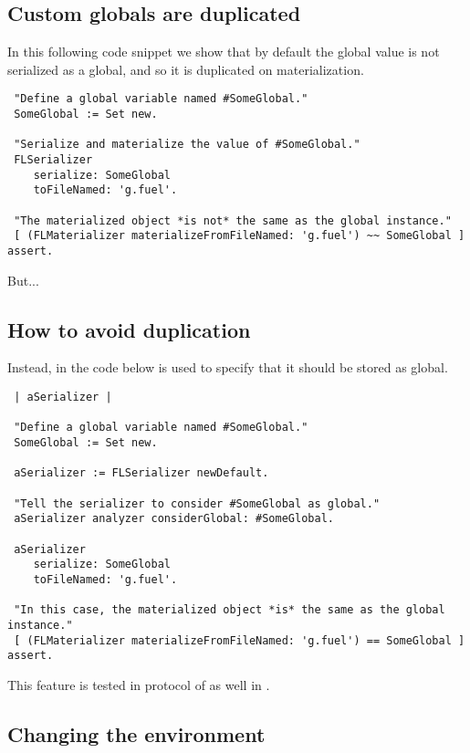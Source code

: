 \documentclass[a4paper,10pt,twoside]{book}
\begin{document}
\subsection{Custom globals are duplicated}

In this following code snippet we show that by default the global value is not serialized as a global, and so it is duplicated on materialization.

\begin{lstlisting}
 "Define a global variable named #SomeGlobal."
 SomeGlobal := Set new.
 
 "Serialize and materialize the value of #SomeGlobal."
 FLSerializer 
 	serialize: SomeGlobal 
 	toFileNamed: 'g.fuel'.
 
 "The materialized object *is not* the same as the global instance."
 [ (FLMaterializer materializeFromFileNamed: 'g.fuel') ~~ SomeGlobal ] assert.
\end{lstlisting}

But...

\subsection{How to avoid duplication}

Instead, in the code below  is used to specify that it should be stored as global.

\begin{lstlisting}
 | aSerializer |
 
 "Define a global variable named #SomeGlobal."
 SomeGlobal := Set new.
 
 aSerializer := FLSerializer newDefault.
 
 "Tell the serializer to consider #SomeGlobal as global."
 aSerializer analyzer considerGlobal: #SomeGlobal.
 
 aSerializer 
 	serialize: SomeGlobal 
 	toFileNamed: 'g.fuel'.
 	
 "In this case, the materialized object *is* the same as the global instance."
 [ (FLMaterializer materializeFromFileNamed: 'g.fuel') == SomeGlobal ] assert.
\end{lstlisting}

This feature is tested in  protocol of  as well in .

\subsection{Changing the environment}
\end{document}
